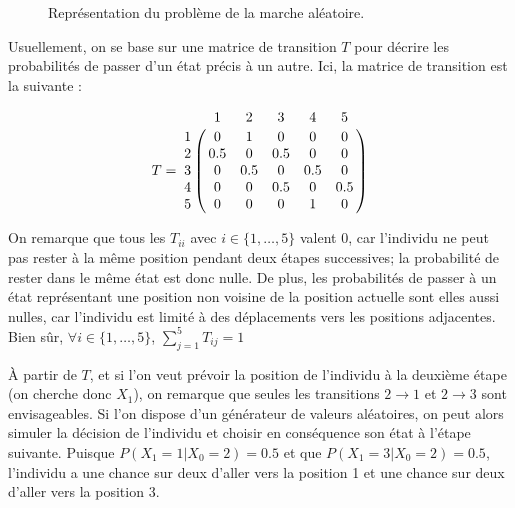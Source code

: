 \documentclass[12pt]{article}
\begin{document}
\begin{figure}[H]
  \centering


  \caption{Représentation du problème de la marche aléatoire.}
  \label{marche}

\end{figure}

Usuellement, on se base sur une matrice de transition $T$ pour décrire
les probabilités de passer d'un état précis à un autre. Ici, la
matrice de transition est la suivante :

$$
T = \bordermatrix{
    & 1 & 2 & 3 & 4 & 5 \cr
  1 & 0 & 1 & 0 & 0 & 0 \cr
  2 & 0.5 & 0 & 0.5 & 0 & 0 \cr
  3 & 0 & 0.5 & 0 & 0.5 & 0 \cr
  4 & 0 & 0 & 0.5 & 0 & 0.5 \cr
  5 & 0 & 0 & 0 & 1 & 0 \cr
}
$$
\vspace{0.5cm}

On remarque que tous les $T_{ii}$ avec $i \in \{1, \dots, 5\}$ valent
0, car l'individu ne peut pas rester à la même position pendant deux
étapes successives; la probabilité de rester dans le même état est
donc nulle. De plus, les probabilités de passer à un état représentant
une position non voisine de la position actuelle sont elles aussi
nulles, car l'individu est limité à des déplacements vers les
positions adjacentes. Bien sûr, $\forall i \in \{1, \dots, 5\}$,
$\sum_{j=1}^5 T_{ij} = 1$

\`A partir de $T$, et si l'on veut prévoir la position de l'individu à
la deuxième étape (on cherche donc $X_1$), on remarque que seules les
transitions $2 \rightarrow 1$ et $2 \rightarrow 3$ sont
envisageables. Si l'on dispose d'un générateur de valeurs aléatoires,
on peut alors simuler la décision de l'individu et choisir en
conséquence son état à l'étape suivante. Puisque $P(X_1 = 1 | X_0 = 2)
= 0.5$ et que $P(X_1 = 3 | X_0 = 2) = 0.5$, l'individu a une chance
sur deux d'aller vers la position 1 et une chance sur deux d'aller
vers la position 3.
\end{document}
